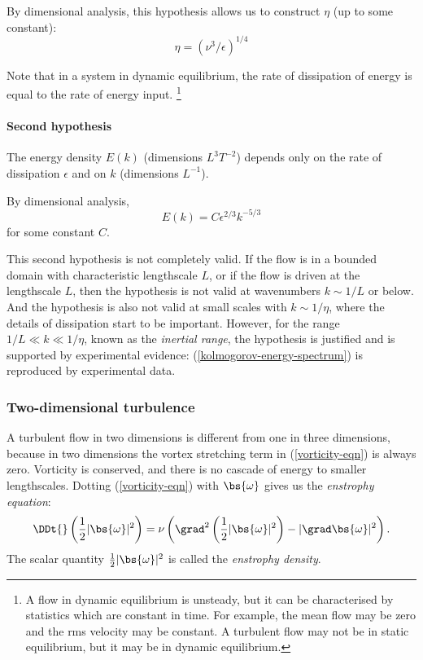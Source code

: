 By dimensional analysis, this hypothesis allows us to construct $\eta$ (up to some constant):
\begin{equation}
    \eta = (\nu^3 / \epsilon)^{1/4}
\end{equation}

Note that in a system in dynamic equilibrium, the rate of dissipation of energy is equal to the rate of energy input.
\footnote{A flow in dynamic equilibrium is unsteady, but it can be characterised by statistics which are constant in time. For example, the mean flow may be zero and the rms velocity may be constant. A turbulent flow may not be in static equilibrium, but it may be in dynamic equilibrium.}

\paragraph{Second hypothesis} The energy density $E(k)$ (dimensions $L^3T^{-2}$) depends only on the rate of dissipation $\epsilon$ and on $k$ (dimensions $L^{-1}$).

By dimensional analysis,
\begin{equation}
    E(k) = C \epsilon^{2/3} k^{-5/3}
    \label{kolmogorov-energy-spectrum}
\end{equation}
for some constant $C$.

This second hypothesis is not completely valid. If the flow is in a bounded domain with characteristic lengthscale $L$, or if the flow is driven at the lengthscale $L$, then the hypothesis is not valid at wavenumbers $k\sim1/L$ or below. And the hypothesis is also not valid at small scales with $k\sim1/\eta$, where the details of dissipation start to be important. However, for the range $1/L\ll k\ll 1/\eta$, known as the \textit{inertial range}, the hypothesis is justified and is supported by experimental evidence: (\ref{kolmogorov-energy-spectrum}) is reproduced by experimental data. 

\subsubsection{Two-dimensional turbulence}

A turbulent flow in two dimensions is different from one in three dimensions, because in two dimensions the vortex stretching term in (\ref{vorticity-eqn}) is always zero. Vorticity is conserved, and there is no cascade of energy to smaller lengthscales. Dotting (\ref{vorticity-eqn}) with
$\bs{\omega}$ gives us the \textit{enstrophy equation}:
\begin{equation}
    \DDt{}\left(\frac{1}{2}|\bs{\omega}|^2\right) 
    = \nu\left(\grad^2 \left( \frac{1}{2}|\bs{\omega}|^2 \right) - |\grad\bs{\omega}|^2\right).
 \label{enstrophy-eqn}
\end{equation}
The scalar quantity $\frac{1}{2}|\bs{\omega}|^2$ is called the \textit{enstrophy density}. 

